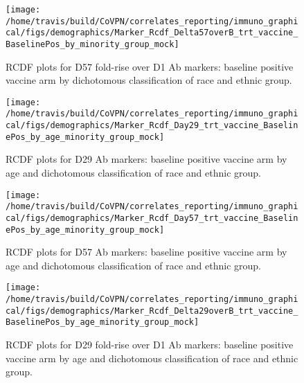 \documentclass[]{book}
\theoremstyle{definition}
\theoremstyle{definition}
\theoremstyle{definition}
\newcommand{\1}{\mathbbm{1}}
\begin{document}
\begin{figure}[H]

{\centering \texttt{[image: /home/travis/build/CoVPN/correlates\_reporting/immuno\_graphical/figs/demographics/Marker\_Rcdf\_Delta57overB\_trt\_vaccine\_BaselinePos\_by\_minority\_group\_mock]} 

}

\caption{RCDF plots for D57 fold-rise over D1 Ab markers: baseline positive vaccine arm by dichotomous classification of race and ethnic group.}\label{fig:unnamed-chunk-123}
\end{figure}

\begin{figure}[H]

{\centering \texttt{[image: /home/travis/build/CoVPN/correlates\_reporting/immuno\_graphical/figs/demographics/Marker\_Rcdf\_Day29\_trt\_vaccine\_BaselinePos\_by\_age\_minority\_group\_mock]} 

}

\caption{RCDF plots for D29 Ab markers: baseline positive vaccine arm by age and dichotomous classification of race and ethnic group.}\label{fig:unnamed-chunk-124}
\end{figure}

\begin{figure}[H]

{\centering \texttt{[image: /home/travis/build/CoVPN/correlates\_reporting/immuno\_graphical/figs/demographics/Marker\_Rcdf\_Day57\_trt\_vaccine\_BaselinePos\_by\_age\_minority\_group\_mock]} 

}

\caption{RCDF plots for D57 Ab markers: baseline positive vaccine arm by age and dichotomous classification of race and ethnic group.}\label{fig:unnamed-chunk-125}
\end{figure}

\begin{figure}[H]

{\centering \texttt{[image: /home/travis/build/CoVPN/correlates\_reporting/immuno\_graphical/figs/demographics/Marker\_Rcdf\_Delta29overB\_trt\_vaccine\_BaselinePos\_by\_age\_minority\_group\_mock]} 

}

\caption{RCDF plots for D29 fold-rise over D1 Ab markers: baseline positive vaccine arm by age and dichotomous classification of race and ethnic group.}\label{fig:unnamed-chunk-126}
\end{figure}
\end{document}
